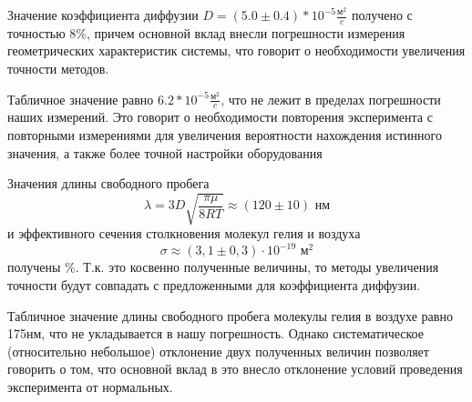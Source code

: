 \documentclass[12pt,a4paper]{article}
\begin{document}
Значение коэффициента диффузии $D = (5.0 \pm 0.4)*10^{-5} \frac{\text{м}^2}{c}$ получено с точностью 8\%, причем основной вклад внесли погрешности измерения геометрических характеристик системы, что говорит о необходимости увеличения точности методов.

Табличное значение равно $6.2 * 10^{-5} \frac{\text{м}^2}{c}$, что не лежит в пределах погрешности наших измерений. Это говорит о необходимости повторения эксперимента с повторными измерениями для увеличения вероятности нахождения истинного значения, а также более точной настройки оборудования

Значения длины свободного пробега \[ \boxed{\lambda = 3D\sqrt{\dfrac{\pi\mu}{8RT}} \approx (120 \pm 10) \text{ нм}}\] и эффективного сечения столкновения молекул гелия и воздуха \[ \boxed{\sigma \approx (3,1 \pm 0,3) \cdot 10^{-19} \text{ м}^2}\] получены \%. Т.к. это косвенно полученные величины, то методы увеличения точности будут совпадать с предложенными для коэффициента диффузии.

Табличное значение длины свободного пробега молекулы гелия в воздухе равно 175нм, что не укладывается в нашу погрешность. Однако систематическое (относительно небольшое) отклонение двух полученных величин позволяет говорить о том, что основной вклад в это внесло отклонение условий проведения эксперимента от нормальных.
\end{document}
